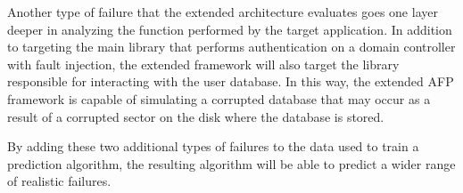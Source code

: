 Another type of failure that the extended architecture evaluates goes one layer
deeper in analyzing the function performed by the target application.  In
addition to targeting the main library that performs authentication on a domain
controller with fault injection, the extended framework will also target the
library responsible for interacting with the user database.  In this way, the
extended AFP framework is capable of simulating a corrupted database that may
occur as a result of a corrupted sector on the disk where the database is
stored.

By adding these two additional types of failures to the data used to train a
prediction algorithm, the resulting algorithm will be able to predict a wider
range of realistic failures.

